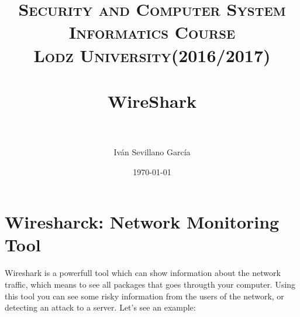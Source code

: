  
 
 \title{	
 	\normalfont \normalsize 
 	\textsc{{\bf Security and Computer System} \\ Informatics Course \\ Lodz University(2016/2017)} \\ [25pt] %
 	\horrule{0.5pt} \\[0.4cm] %
 	\huge WireShark \\ %
 	\horrule{2pt} \\[0.5cm] %
 }
 
 \author{Iván Sevillano García} %
 
 \date{\normalsize\today} %
 
 
 	
 	\maketitle %
 	
 	\newpage %
 	
 	\section{Wiresharck: Network Monitoring Tool}
 	
 	Wireshark is a powerfull tool which can show information about the network traffic, which means to see all packages that goes througth your computer. Using this tool you can see some risky information from the users of the network, or detecting an attack to a server. Let's see an example:\\
 	
